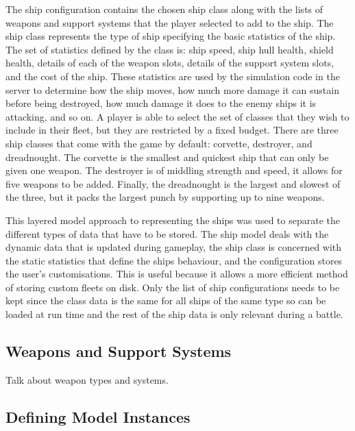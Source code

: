 The ship configuration contains the chosen ship class along with the lists of weapons and support systems that the player selected to add to the ship. The ship class represents the type of ship specifying the basic statistics of the ship. The set of statistics defined by the class is: ship speed, ship hull health, shield health, details of each of the weapon slots, details of the support system slots, and the cost of the ship. These statistics are used by the simulation code in the server to determine how the ship moves, how much more damage it can sustain before being destroyed, how much damage it does to the enemy ships it is attacking, and so on. A player is able to select the set of classes that they wish to include in their fleet, but they are restricted by a fixed budget. There are three ship classes that come with the game by default: corvette, destroyer, and dreadnought. The corvette is the smallest and quickest ship that can only be given one weapon. The destroyer is of middling strength and speed, it allows for five weapons to be added. Finally, the dreadnought is the largest and slowest of the three, but it packs the largest punch by supporting up to nine weapons.

This layered model approach to representing the ships was used to separate the different types of data that have to be stored. The ship model deals with the dynamic data that is updated during gameplay, the ship class is concerned with the static statistics that define the ships behaviour, and the configuration stores the user's customisations. This is useful because it allows a more efficient method of storing custom fleets on disk. Only the list of ship configurations needs to be kept since the class data is the same for all ships of the same type so can be loaded at run time and the rest of the ship data is only relevant during a battle.


\subsection{Weapons and Support Systems}

Talk about weapon types and systems.

\subsection{Defining Model Instances}

